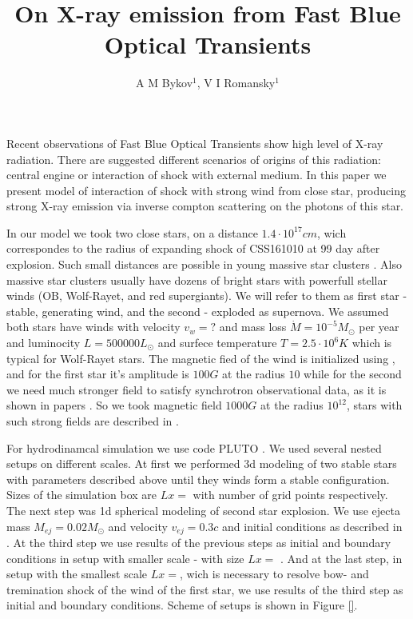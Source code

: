 \documentclass[a4paper,12pt]{extreport}
\begin{document}
	\title{On X-ray emission from Fast Blue Optical Transients}
	
	\author{A M Bykov$^{1}$, V I Romansky$^{1}$}
	

Recent observations of Fast Blue Optical Transients \cite{Margutti2019,Ho2020,Coppejans2020} show high level of X-ray radiation. There are suggested different scenarios of  origins of this radiation: central engine or interaction of shock with external medium. In this paper we present model of interaction of shock with strong wind from close star, producing strong X-ray emission via inverse compton scattering on the photons of this star.


In our model we took two close stars, on a distance $1.4\cdot10^{17} cm$, wich correspondes to the radius of expanding shock of CSS161010 at 99 day after explosion. Such small distances are possible in young massive star clusters \cite{}. Also massive star clusters usually have dozens of bright stars with powerfull stellar winds (OB, Wolf-Rayet, and red supergiants). We will refer to them as first star - stable, generating wind, and the second - exploded as supernova. We assumed both stars have winds with velocity $v_w = ?$ and mass loss $\dot{M} = 10^{-5} M_\odot $ per year and luminocity $L=500000 L_\odot$ and surfece temperature $T = 2.5\cdot10^6 K$ which is typical for Wolf-Rayet stars. The magnetic fied of the wind is initialized using \cite{}, and for the first star  it's amplitude is $100 G$ at the radius $10$ while for the second we need much stronger field to satisfy synchrotron observational data, as it is shown in papers \cite{Coppejans2020, BykovUniverse}. So we took magnetic field $1000 G$ at the radius $10^{12}$, stars with such strong fields are described in \cite{}.

For hydrodinamcal simulation we use code PLUTO \cite{MignonePluto}. We used several nested setups on different scales. At first we performed 3d modeling of two stable stars with parameters described above until they winds form a stable configuration. Sizes of the simulation box are $Lx = $ with number of grid points respectively. The next step was 1d spherical modeling of second star explosion. We use ejecta mass $M_{ej} = 0.02 M_\odot$ and velocity $v_{ej} = 0.3 c$ and initial conditions as described in \cite{}. At the third step we use results of the previous steps as initial and boundary conditions in setup with smaller scale - with size $Lx = $ . And at the last step, in setup with the smallest scale $Lx = $, wich is necessary to resolve bow- and tremination shock of the wind of the first star, we use results of the third step as initial and boundary conditions. Scheme of setups is shown in Figure \ref{}.
\end{document}
